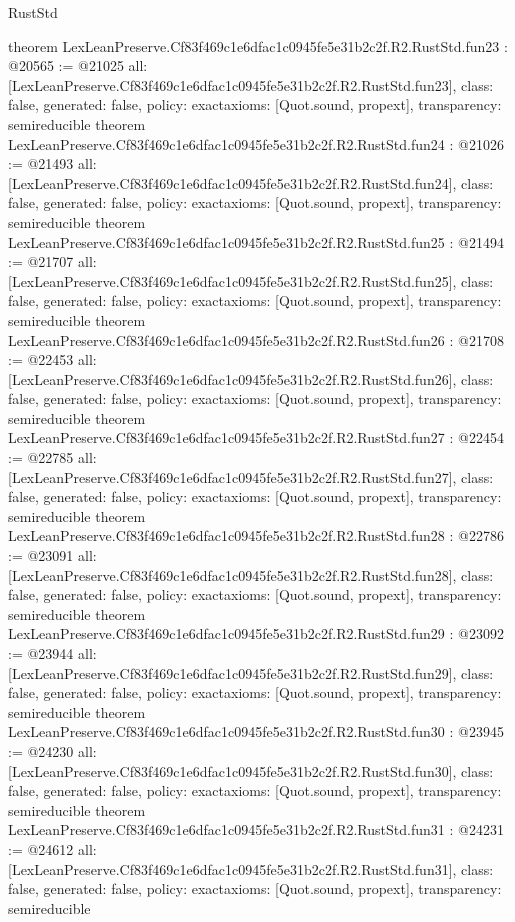 \begin{lexlean}{RustStd}
\begin{coremodule}
{}
theorem LexLeanPreserve.Cf83f469c1e6dfac1c0945fe5e31b2c2f.R2.RustStd.fun23 : @20565 := @21025 {
  all: [LexLeanPreserve.Cf83f469c1e6dfac1c0945fe5e31b2c2f.R2.RustStd.fun23],
  class: false,
  generated: false,
  policy: exact{axioms: [Quot.sound, propext]},
  transparency: semireducible
}
theorem LexLeanPreserve.Cf83f469c1e6dfac1c0945fe5e31b2c2f.R2.RustStd.fun24 : @21026 := @21493 {
  all: [LexLeanPreserve.Cf83f469c1e6dfac1c0945fe5e31b2c2f.R2.RustStd.fun24],
  class: false,
  generated: false,
  policy: exact{axioms: [Quot.sound, propext]},
  transparency: semireducible
}
theorem LexLeanPreserve.Cf83f469c1e6dfac1c0945fe5e31b2c2f.R2.RustStd.fun25 : @21494 := @21707 {
  all: [LexLeanPreserve.Cf83f469c1e6dfac1c0945fe5e31b2c2f.R2.RustStd.fun25],
  class: false,
  generated: false,
  policy: exact{axioms: [Quot.sound, propext]},
  transparency: semireducible
}
theorem LexLeanPreserve.Cf83f469c1e6dfac1c0945fe5e31b2c2f.R2.RustStd.fun26 : @21708 := @22453 {
  all: [LexLeanPreserve.Cf83f469c1e6dfac1c0945fe5e31b2c2f.R2.RustStd.fun26],
  class: false,
  generated: false,
  policy: exact{axioms: [Quot.sound, propext]},
  transparency: semireducible
}
theorem LexLeanPreserve.Cf83f469c1e6dfac1c0945fe5e31b2c2f.R2.RustStd.fun27 : @22454 := @22785 {
  all: [LexLeanPreserve.Cf83f469c1e6dfac1c0945fe5e31b2c2f.R2.RustStd.fun27],
  class: false,
  generated: false,
  policy: exact{axioms: [Quot.sound, propext]},
  transparency: semireducible
}
theorem LexLeanPreserve.Cf83f469c1e6dfac1c0945fe5e31b2c2f.R2.RustStd.fun28 : @22786 := @23091 {
  all: [LexLeanPreserve.Cf83f469c1e6dfac1c0945fe5e31b2c2f.R2.RustStd.fun28],
  class: false,
  generated: false,
  policy: exact{axioms: [Quot.sound, propext]},
  transparency: semireducible
}
theorem LexLeanPreserve.Cf83f469c1e6dfac1c0945fe5e31b2c2f.R2.RustStd.fun29 : @23092 := @23944 {
  all: [LexLeanPreserve.Cf83f469c1e6dfac1c0945fe5e31b2c2f.R2.RustStd.fun29],
  class: false,
  generated: false,
  policy: exact{axioms: [Quot.sound, propext]},
  transparency: semireducible
}
theorem LexLeanPreserve.Cf83f469c1e6dfac1c0945fe5e31b2c2f.R2.RustStd.fun30 : @23945 := @24230 {
  all: [LexLeanPreserve.Cf83f469c1e6dfac1c0945fe5e31b2c2f.R2.RustStd.fun30],
  class: false,
  generated: false,
  policy: exact{axioms: [Quot.sound, propext]},
  transparency: semireducible
}
theorem LexLeanPreserve.Cf83f469c1e6dfac1c0945fe5e31b2c2f.R2.RustStd.fun31 : @24231 := @24612 {
  all: [LexLeanPreserve.Cf83f469c1e6dfac1c0945fe5e31b2c2f.R2.RustStd.fun31],
  class: false,
  generated: false,
  policy: exact{axioms: [Quot.sound, propext]},
  transparency: semireducible
}
\end{coremodule}
\end{lexlean}
